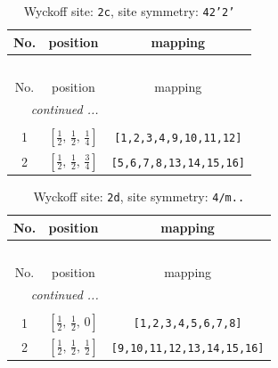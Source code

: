 \documentclass[fleqn,8pt]{jsarticle}
\begin{document}
\renewcommand{\arraystretch}{1.2}
\begin{longtable}{ccc}
\caption{Wyckoff site: {\tt 2c}, site symmetry: {\tt 42'2'}}
 \\
 \hline \hline
No. & position & mapping \\ \hline \endfirsthead

\multicolumn{2}{l}{\tablename\ \thetable{}} \\
 \hline \hline
No. & position & mapping \\ \hline \endhead

 \hline \hline
\multicolumn{2}{r}{\footnotesize\it continued ...} \\ \endfoot

 \hline \hline
\multicolumn{2}{r}{} \\ \endlastfoot

1 & $\left[ \frac{1}{2},\, \frac{1}{2},\, \frac{1}{4} \right]$ & {\tt [1,2,3,4,9,10,11,12]} \\ \hline
2 & $\left[ \frac{1}{2},\, \frac{1}{2},\, \frac{3}{4} \right]$ & {\tt [5,6,7,8,13,14,15,16]} \\
\end{longtable}
\renewcommand{\arraystretch}{1.2}
\begin{longtable}{ccc}
\caption{Wyckoff site: {\tt 2d}, site symmetry: {\tt 4/m..}}
 \\
 \hline \hline
No. & position & mapping \\ \hline \endfirsthead

\multicolumn{2}{l}{\tablename\ \thetable{}} \\
 \hline \hline
No. & position & mapping \\ \hline \endhead

 \hline \hline
\multicolumn{2}{r}{\footnotesize\it continued ...} \\ \endfoot

 \hline \hline
\multicolumn{2}{r}{} \\ \endlastfoot

1 & $\left[ \frac{1}{2},\, \frac{1}{2},\, 0 \right]$ & {\tt [1,2,3,4,5,6,7,8]} \\ \hline
2 & $\left[ \frac{1}{2},\, \frac{1}{2},\, \frac{1}{2} \right]$ & {\tt [9,10,11,12,13,14,15,16]} \\
\end{longtable}
\renewcommand{\arraystretch}{1.2}
\end{document}
